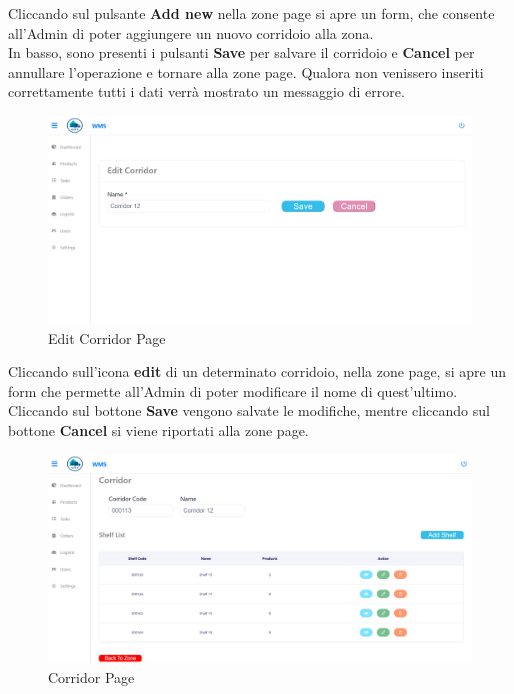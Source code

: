 Cliccando sul pulsante \textbf{Add new} nella zone page si apre un form, che consente
all'Admin di poter aggiungere un nuovo corridoio alla zona.\\
In basso, sono presenti i pulsanti \textbf{Save} per salvare il corridoio e \textbf{Cancel} per annullare l'operazione
e tornare alla zone page.
Qualora non venissero inseriti correttamente tutti i dati verrà mostrato un messaggio di errore.

\begin{figure}[H]
    \centering
    \includegraphics[width=\textwidth]{document/sections/img/Storyboard/editCorridorPage.png}
    \caption{Edit Corridor Page}
    \label{fig:editCorridorPage}
\end{figure}

Cliccando sull'icona \textbf{edit} di un determinato corridoio, nella zone page, si apre un form
che permette all'Admin di poter modificare il nome di quest'ultimo.\\
Cliccando sul bottone \textbf{Save} vengono salvate le modifiche, mentre cliccando sul bottone \textbf{Cancel} si viene
riportati alla zone page.

\begin{figure}[H]
    \centering
    \includegraphics[width=\textwidth]{document/sections/img/Storyboard/viewCorridor.png}
    \caption{Corridor Page}
    \label{fig:corridorPage}
\end{figure}


